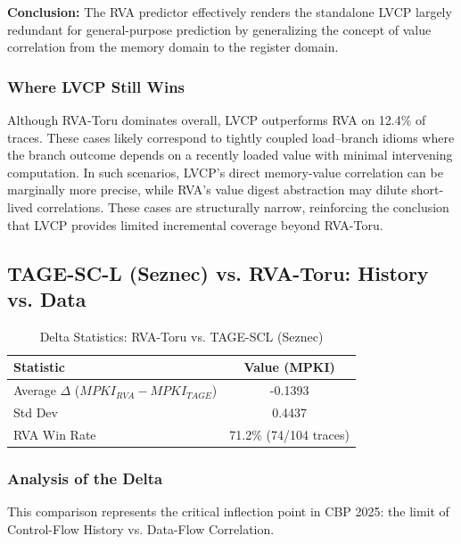 \documentclass[11pt,a4paper]{article}
\begin{document}
\textbf{Conclusion:} The RVA predictor effectively renders the standalone LVCP largely redundant for general-purpose prediction by generalizing the concept of value correlation from the memory domain to the register domain.
\subsubsection{Where LVCP Still Wins}
Although RVA-Toru dominates overall, LVCP outperforms RVA on 12.4\% of traces. These cases likely correspond to tightly coupled load--branch idioms where the branch outcome depends on a recently loaded value with minimal intervening computation. In such scenarios, LVCP’s direct memory-value correlation can be marginally more precise, while RVA’s value digest abstraction may dilute short-lived correlations. These cases are structurally narrow, reinforcing the conclusion that LVCP provides limited incremental coverage beyond RVA-Toru.

\subsection{TAGE-SC-L (Seznec) vs. RVA-Toru: History vs. Data}

\begin{table}[h!]
\centering
\begin{tabular}{|l|c|}
\hline
\textbf{Statistic} & \textbf{Value (MPKI)} \\
\hline
Average $\Delta$ ($MPKI_{RVA} - MPKI_{TAGE}$) & -0.1393 \\
Std Dev & 0.4437 \\
RVA Win Rate & 71.2\% (74/104 traces) \\
\hline
\end{tabular}
\caption{Delta Statistics: RVA-Toru vs. TAGE-SCL (Seznec)}
\end{table}

\subsubsection{Analysis of the Delta}
This comparison represents the critical inflection point in CBP 2025: the limit of Control-Flow History vs. Data-Flow Correlation.
\end{document}
